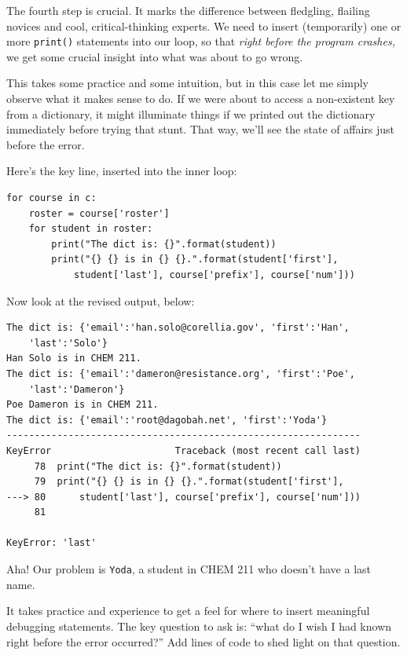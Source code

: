 \medskip

The fourth step is crucial. It marks the difference between fledgling, flailing
novices and cool, critical-thinking experts. We need to insert (temporarily)
one or more \texttt{print()} statements into our loop, so that \textit{right
before the program crashes,} we get some crucial insight into what was about
to go wrong.

\medskip

This takes some practice and some intuition, but in this case let me simply
observe what it makes sense to do. If we were about to access a non-existent
key from a dictionary, it might illuminate things if we printed out the
dictionary immediately before trying that stunt. That way, we'll see the state
of affairs just before the error.

\smallskip
Here's the key line, inserted into the inner loop:

\begin{Verbatim}[fontsize=\footnotesize,samepage=true,frame=single,framesep=3mm]
for course in c:
    roster = course['roster']
    for student in roster:
        print("The dict is: {}".format(student))
        print("{} {} is in {} {}.".format(student['first'], 
            student['last'], course['prefix'], course['num'])) 
\end{Verbatim}

Now look at the revised output, below:

\begin{Verbatim}[fontsize=\footnotesize,samepage=true,frame=leftline,framesep=5mm,framerule=1mm]
The dict is: {'email':'han.solo@corellia.gov', 'first':'Han',
    'last':'Solo'}
Han Solo is in CHEM 211.
The dict is: {'email':'dameron@resistance.org', 'first':'Poe',
    'last':'Dameron'}
Poe Dameron is in CHEM 211.
The dict is: {'email':'root@dagobah.net', 'first':'Yoda'}
---------------------------------------------------------------
KeyError                      Traceback (most recent call last)
     78  print("The dict is: {}".format(student))
     79  print("{} {} is in {} {}.".format(student['first'], 
---> 80      student['last'], course['prefix'], course['num'])) 
     81 

KeyError: 'last'
\end{Verbatim}


Aha! Our problem is \texttt{Yoda}, a student in CHEM 211 who doesn't have a
last name.

It takes practice and experience to get a feel for where to insert meaningful
debugging statements. The key question to ask is: ``what do I wish I had known
right before the error occurred?'' Add lines of code to shed light on that
question.


